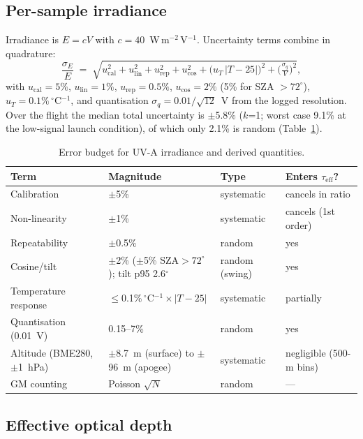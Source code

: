 \documentclass[11pt,a4paper]{article}
\begin{document}
\subsection{Per-sample irradiance}

Irradiance is $E = cV$ with $c = 40$~W\,m$^{-2}$\,V$^{-1}$. Uncertainty terms combine in
quadrature:
\begin{equation}
\frac{\sigma_E}{E} \;=\;
\sqrt{u_{\mathrm{cal}}^2 + u_{\mathrm{lin}}^2 + u_{\mathrm{rep}}^2
      + u_{\cos}^2 + \big(u_T\,|T-25|\big)^2
      + \Big(\tfrac{\sigma_q}{V}\Big)^2},
\label{eq:esig}
\end{equation}
with $u_{\mathrm{cal}}=5\%$, $u_{\mathrm{lin}}=1\%$, $u_{\mathrm{rep}}=0.5\%$,
$u_{\cos}=2\%$ (5\% for SZA $>72^\circ$), $u_T=0.1\%\,^\circ$C$^{-1}$, and quantisation
$\sigma_q = 0.01/\sqrt{12}$~V from the logged resolution. Over the flight the median total
uncertainty is $\pm$5.8\% ($k$=1; worst case 9.1\% at the low-signal launch condition), of
which only 2.1\% is random (Table~\ref{tab:budget}).

\begin{table}[htbp]
\centering
\footnotesize
\caption{Error budget for UV-A irradiance and derived quantities.}
\label{tab:budget}
\begin{tabular}{llll}
\toprule
Term & Magnitude & Type & Enters $\tau_{\mathrm{eff}}$? \\
\midrule
Calibration & $\pm$5\% & systematic & cancels in ratio \\
Non-linearity & $\pm$1\% & systematic & cancels (1st order) \\
Repeatability & $\pm$0.5\% & random & yes \\
Cosine/tilt & $\pm$2\% ($\pm$5\% SZA$>72^\circ$); tilt p95 2.6$^\circ$ & random (swing) & yes \\
Temperature response & $\le$0.1\%\,$^\circ$C$^{-1}\times|T-25|$ & systematic & partially \\
Quantisation (0.01~V) & 0.15--7\% & random & yes \\
\midrule
Altitude (BME280, $\pm$1~hPa) & $\pm$8.7~m (surface) to $\pm$96~m (apogee) & systematic & negligible (500-m bins) \\
GM counting & Poisson $\sqrt{N}$ & random & --- \\
\bottomrule
\end{tabular}
\end{table}

\subsection{Effective optical depth}
\end{document}
